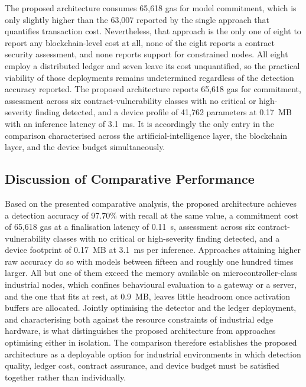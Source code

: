 The proposed architecture consumes 65{,}618 gas for model commitment, which is only slightly higher than the 63{,}007 reported by the single approach that quantifies transaction cost. Nevertheless, that approach is the only one of eight to report any blockchain-level cost at all, none of the eight reports a contract security assessment, and none reports support for constrained nodes. All eight employ a distributed ledger and seven leave its cost unquantified, so the practical viability of those deployments remains undetermined regardless of the detection accuracy reported.
The proposed architecture reports 65{,}618 gas for commitment, assessment across
six contract-vulnerability classes with no critical or high-severity finding
detected, and a device profile of 41{,}762 parameters at 0.17~MB with an
inference latency of 3.1~ms. It is accordingly the only entry in the comparison
characterised across the artificial-intelligence layer, the blockchain layer,
and the device budget simultaneously.

\subsection{Discussion of Comparative Performance}
\label{sec:sota-discussion}
Based on the presented comparative analysis, the proposed architecture achieves a detection accuracy of 97.70\% with recall at the same value, a commitment cost of 65{,}618 gas at a finalisation latency of 0.11~s, assessment across six contract-vulnerability classes with no critical or high-severity finding detected, and a device footprint of 0.17~MB at 3.1~ms per inference. Approaches attaining higher raw accuracy do so with models between fifteen and roughly one hundred times larger. All but one of them exceed the memory available on microcontroller-class industrial nodes, which confines behavioural evaluation to a gateway or a server, and the one that fits at rest, at 0.9~MB, leaves little headroom once activation buffers are allocated.
Jointly optimising the detector and the ledger deployment, and characterising both against the resource constraints of industrial edge hardware, is what distinguishes the proposed architecture from approaches optimising either in isolation. The comparison therefore establishes the proposed architecture as a deployable option for industrial environments in which detection quality, ledger cost, contract assurance, and device budget must be satisfied together rather than individually.


